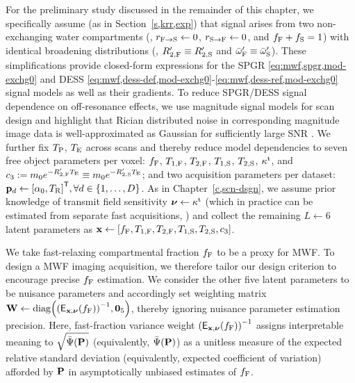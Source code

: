 For the preliminary study
discussed in the remainder of this chapter,
we specifically assume (as in Section~\ref{s,krr,exp}) 
that signal arises
from two non-exchanging water compartments
(\ie, $r_{\mathrm{F}\to\mathrm{S}} \gets 0$, $r_{\mathrm{S}\to\mathrm{F}} \gets 0$, and $f_{\mathrm{F}} + f_{\mathrm{S}} = 1$)
with identical broadening distributions
(\ie, $R_{2,\mathrm{F}}' \equiv R_{2,\mathrm{S}}'$ and $\bar{\omega}_{\mathrm{F}}' \equiv \bar{\omega}_{\mathrm{S}}'$).
These simplifications provide closed-form expressions
for the SPGR 
\eqref{eq:mwf,spgr,mod-exchg0}
and DESS 
\eqref{eq:mwf,dess-def,mod-exchg0}-\eqref{eq:mwf,dess-ref,mod-exchg0}
signal models 
as well as their gradients.
To reduce SPGR/DESS signal dependence
on off-resonance effects,
we use magnitude signal models
for scan design
and highlight 
that Rician distributed noise 
in corresponding magnitude image data
is well-approximated as Gaussian
for sufficiently large SNR \cite{gudbjartsson:95:trd}. 
We further fix $T_\mathrm{P}$, $T_\mathrm{E}$ across scans
and thereby reduce model dependencies 
to seven free object parameters per voxel:
$f_{\mathrm{F}}$, $T_{1,\mathrm{F}}$, $T_{2,\mathrm{F}}$, $T_{1,\mathrm{S}}$, $T_{2,\mathrm{S}}$, $\kappa^{\mathrm{t}}$, and
$c_{3} := m_0 e^{-R_{2,\mathrm{F}}' T_\mathrm{E}} \equiv m_0 e^{-R_{2,\mathrm{S}}' T_\mathrm{E}}$;
and two acquisition parameters per dataset:
$\bmp_d \gets \brac{\flipnom, \TR}\tpose, \forall d \in \set{1,\dots,D}$.
As in Chapter~\ref{c,scn-dsgn},
we assume prior knowledge 
of transmit field sensitivity $\boldsymbol{\nu} \gets \kappa^{\mathrm{t}}$ 
(which in practice can be estimated
from separate fast acquisitions, \eg \cite{sacolick:10:bmb})
and collect the remaining $L \gets 6$ latent parameters
as $\bmx \gets \brac{\ff, \tf{1}, \tf{2}, \ts{1}, \ts{2}, \const{3}}$.

We take fast-relaxing compartmental fraction $f_{\mathrm{F}}$ 
to be a proxy for MWF.
To design a MWF imaging acquisition,
we therefore tailor our design criterion
to encourage precise $f_{\mathrm{F}}$ estimation.
We consider the other five latent parameters
to be nuisance parameters
and accordingly set weighting matrix
$\bmW \gets \diag{\inv{\expect{\bmx,\bmnu}{\ff}}, \zeros{5}}$,
thereby ignoring nuisance parameter
estimation precision.
Here, 
fast-fraction variance weight 
$\inv{\expect{\bmx,\bmnu}{\ff}}$ assigns interpretable meaning
to $\sqrt{\expcost\paren{\bmP}}$ (equivalently, $\expcost\paren{\bmP}$)
as a unitless measure
of the expected relative standard deviation 
(equivalently, expected coefficient of variation)
afforded by $\mathbf{P}$ 
in asymptotically unbiased estimates of $f_{\mathrm{F}}$. 

